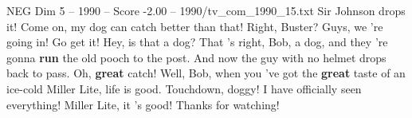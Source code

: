 \begin{textsample}{NEG Dim 5 – 1990 – Score -2.00 – 1990/tv\_com\_1990\_15.txt}  \label{ex:f5_neg_077}
Sir Johnson drops it!
Come on, my dog can catch better than that!
Right, Buster?
Guys, we 're going in!
Go get it!
Hey, is that a dog?
That 's right, Bob, a dog, and they 're gonna \textbf{run} the old pooch to the post.
And now the guy with no helmet drops back to pass.
Oh, \textbf{great} catch!
Well, Bob, when you 've got the \textbf{great} taste of an ice-cold Miller Lite, life is good.
Touchdown, doggy!
I have officially seen everything!
Miller Lite, it 's good!
Thanks for watching!

\end{textsample}
